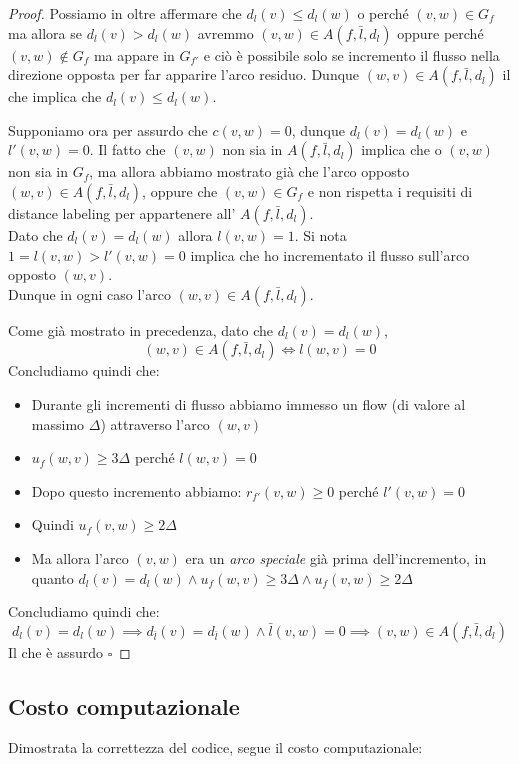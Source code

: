 \documentclass[a4paper, 11pt]{report}
\newcommand*{\QED}{\null\nobreak\hfill\ensuremath{\square}}%
\begin{document}
\begin{proof}
    Possiamo in oltre affermare che $d_l(v)\le d_l(w)$ o perché $(v,w) \in G_f$ ma allora se $d_l(v)> d_l(w)$ avremmo $(v,w) \in A(f,\bar{l}, d_l)$
    oppure perché $(v,w) \not \in G_f$ ma appare in $G_{f'}$ e ciò è possibile solo se incremento il flusso nella direzione opposta per far apparire l'arco residuo. Dunque $(w,v) \in A(f,\bar{l}, d_l)$ il che implica che $d_l(v)\le d_l(w)$.

    Supponiamo ora per assurdo che $c(v,w) = 0$, dunque $d_l(v) = d_l(w)$ e $l'(v,w) = 0$.
    Il fatto che $(v,w)$ non sia in $A(f,\bar{l}, d_l)$ implica che o $(v,w)$ non sia in $G_f$, ma allora abbiamo mostrato già che l'arco opposto $(w,v)\in A(f,\bar{l}, d_l)$, 
    oppure che $(v,w) \in G_f$ e non rispetta i requisiti di distance labeling per appartenere all' $A(f,\bar{l}, d_l)$.\\
    Dato che $d_l(v) = d_l(w)$ allora $l(v,w) = 1$. Si nota $1 = l(v,w) > l'(v,w) = 0$ implica che ho incrementato il flusso sull'arco opposto $(w,v)$.\\
    Dunque in ogni caso l'arco $(w,v)\in A(f,\bar{l}, d_l)$.

    Come già mostrato in precedenza, dato che $d_l(v) = d_l(w)$, \[(w,v)\in A(f,\bar{l}, d_l) \iff l(w,v) = 0\]
    Concludiamo quindi che: 
    \begin{itemize}
        \item Durante gli incrementi di flusso abbiamo immesso un flow (di valore al massimo $\Delta$) attraverso l'arco $(w,v)$
        \item $u_f(w,v) \ge 3\Delta$ perché $l(w,v) = 0$
        \item Dopo questo incremento abbiamo: $r_{f'}(v,w) \ge 0$ perché  $l'(v,w) = 0$
        \item Quindi $u_f(v,w) \ge 2\Delta$
        \item Ma allora l'arco $(v,w)$ era un \textit{arco speciale} già prima dell'incremento, in quanto $d_l(v) = d_l(w) \land u_f(w,v) \ge 3\Delta \land u_f(v,w) \ge 2\Delta$
    \end{itemize}
    Concludiamo quindi che: 
    \[d_l(v) = d_l(w) \implies d_{\bar{l}}(v) = d_{\bar{l}}(w) \land \bar{l}(v,w) = 0 \implies (v,w) \in A(f,\bar{l}, d_l)\]
    Il che è assurdo 
    \QED
    \end{proof}
    \subsection{Costo computazionale}
    Dimostrata la correttezza del codice, segue il costo computazionale:
\end{document}
